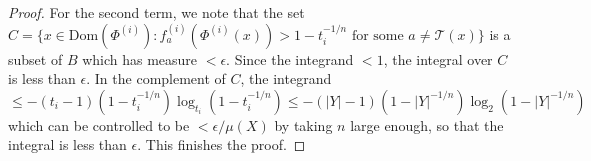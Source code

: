 \documentclass[10pt,a4paper]{amsart}
\newcommand{\cT}{\mathcal{T}}
\begin{document}
\begin{proof}
	For the second term, we note that the set $C = \{x \in \mathrm{Dom}(\Phi^{(i)}):f^{(i)}_a(\Phi^{(i)}(x)) > 1 - t_i^{-1/n} \textrm{ for some } a\not=\cT(x)\}$ is a subset of $B$ which has measure $< \epsilon$. Since the integrand $< 1$, the integral over $C$ is less than $\epsilon$. In the complement of $C$, the integrand $\leq -(t_i-1)(1 - t_i^{-1/n}) \log_{t_i} (1 - t_i^{-1/n}) \leq -(|Y|-1)(1 - |Y|^{-1/n}) \log_{2} (1 - |Y|^{-1/n})$ which can be controlled to be $<\epsilon / \mu(X)$ by taking $n$ large enough, so that the integral is less than $\epsilon$. This finishes the proof.
\end{proof}
\end{document}
